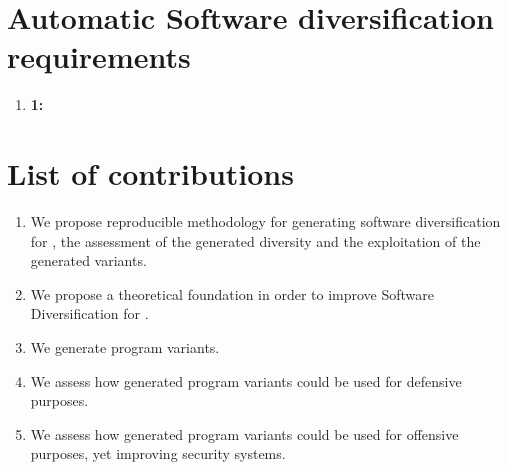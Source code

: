 
\section{Automatic Software diversification requirements}

\begin{enumerate}
	\item \textbf{1:} 
\end{enumerate}

\section{List of contributions}



\begin{enumerate}[label=\textbf{C\arabic*}, ref=C\arabic*]
	\item \label{methodcontrib}  We propose reproducible methodology for generating software diversification for \Wasm, the assessment of the generated diversity and the exploitation of the generated variants.
	
	\item \label{therycontrib}  We propose a theoretical foundation in order to improve Software Diversification for \Wasm.
	
	\item \label{generationcontrib}  We generate \Wasm program variants.
	
	\item \label{defensivecontrib}  We assess how generated \Wasm program variants could be used for defensive purposes.
	
	\item \label{ofensivecontrib}  We assess how generated \Wasm program variants could be used for offensive purposes, yet improving security systems.
	
\end{enumerate}


